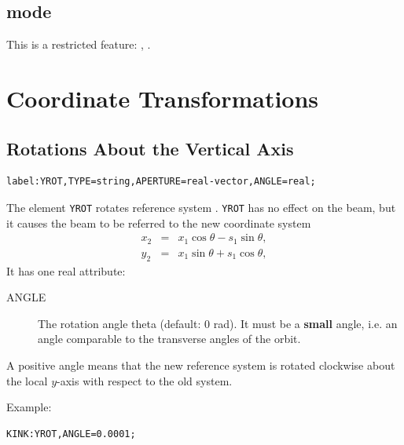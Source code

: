 \subsection{\opalcycl mode}

This is a restricted feature: \noopalt, \noopalcycl .

\section{Coordinate Transformations}
\label{sec:rotation}

\subsection{Rotations About the Vertical Axis}
\label{sec:yrot}
\begin{verbatim}
label:YROT,TYPE=string,APERTURE=real-vector,ANGLE=real;
\end{verbatim}
The element \texttt{YROT} rotates reference system 
.
\texttt{YROT} has no effect on the beam,
but it causes the beam to be referred to the new coordinate system
\[\begin{array}{lcl}
  x_2&=&x_1\cos\theta-s_1\sin\theta, \\
  y_2&=&x_1\sin\theta+s_1\cos\theta,
\end{array}\]
It has one real attribute:
\begin{description}
\item[ANGLE]
  The rotation angle theta (default: 0 rad).
  It must be a \textbf{small} angle,
  i.e. an angle comparable to the transverse angles of the orbit.
\end{description}
A positive angle means that the new reference system is rotated
clockwise about the local $y$-axis with respect to the old system.

\noindent Example:
\begin{verbatim}
KINK:YROT,ANGLE=0.0001;
\end{verbatim}

